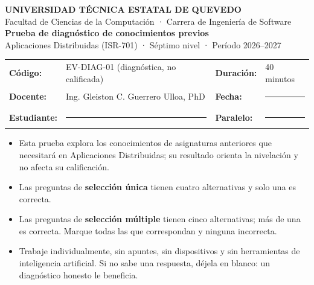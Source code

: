 \documentclass[11pt,a4paper]{article}
\newif\ifclave
\newcounter{preg}
\begin{document}
\begin{center}
	{\large\bfseries\color{uteqBlue} UNIVERSIDAD TÉCNICA ESTATAL DE QUEVEDO}\\[2pt]
	{\normalsize Facultad de Ciencias de la Computación · Carrera de Ingeniería de Software}\\[8pt]
	{\Large\bfseries\color{uteqMid} Prueba de diagnóstico de conocimientos previos\ifclave{} -- Clave de respuestas\fi}\\[3pt]
	{\normalsize Aplicaciones Distribuidas (ISR-701) · Séptimo nivel · Período 2026--2027}
\end{center}

\begin{tabularx}{\textwidth}{@{}l p{6.9cm} l X@{}}
	\toprule
	\textbf{Código:} & EV-DIAG-01 (diagnóstica, no calificada) & \textbf{Duración:} & 40 minutos \\
	\textbf{Docente:} & Ing. Gleiston C. Guerrero Ulloa, PhD & \textbf{Fecha:} & \rule{3.5cm}{0.4pt} \\
	\textbf{Estudiante:} & \rule{5cm}{0.4pt} & \textbf{Paralelo:} & \rule{2cm}{0.4pt} \\
	\bottomrule
\end{tabularx}

\begin{tcolorbox}[colback=uteqBlue!4,colframe=uteqBlue,boxrule=0.5pt,arc=1mm,title=Instrucciones,fonttitle=\bfseries\small,fontupper=\small]
	\begin{itemize}[leftmargin=1.2em,itemsep=0pt,topsep=0pt]
		\item Esta prueba explora los conocimientos de asignaturas anteriores que necesitará en Aplicaciones Distribuidas; su resultado orienta la nivelación y no afecta su calificación.
		\item Las preguntas de \textbf{selección única} tienen cuatro alternativas y solo una es correcta.
		\item Las preguntas de \textbf{selección múltiple} tienen cinco alternativas; más de una es correcta. Marque todas las que correspondan y ninguna incorrecta.
		\item Trabaje individualmente, sin apuntes, sin dispositivos y sin herramientas de inteligencia artificial. Si no sabe una respuesta, déjela en blanco: un diagnóstico honesto le beneficia.
	\end{itemize}
\end{tcolorbox}

\end{document}
